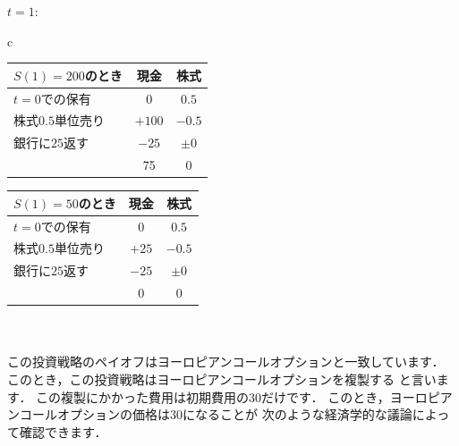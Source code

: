 $t=1$:
\begin{table}[htbp]
  \begin{center}
    \begin{tabular}{c}

      \begin{minipage}{0.5\hsize}
        \begin{center}
          \begin{tabular}{|l|c|c|}
            \hline
            $S(1)=200$のとき & 現金 & 株式 \\ \hline \hline
            $t=0$での保有 & 0 & $0.5$ \\
            株式$0.5$単位売り & $+100$ & $-0.5$ \\
            銀行に$25$返す & $-25$ & $\pm$0 \\ \hline
             & 75 & 0 \\
            \hline
          \end{tabular}
        \end{center}
      \end{minipage}

      \begin{minipage}{0.5\hsize}
        \begin{center}
          \begin{tabular}{|l|c|c|}
            \hline
            $S(1)=50$のとき & 現金 & 株式 \\ \hline \hline
            $t=0$での保有 & 0 & $0.5$ \\
            株式$0.5$単位売り & $+25$ & $-0.5$ \\
            銀行に$25$返す & $-25$ & $\pm$0 \\ \hline
             & 0 & 0 \\
            \hline
          \end{tabular}
        \end{center}
      \end{minipage}

    \end{tabular}
  \end{center}
\end{table}
\\
\\
この投資戦略のペイオフはヨーロピアンコールオプションと一致しています．
このとき，この投資戦略はヨーロピアンコールオプションを複製する
と言います．
この複製にかかった費用は初期費用の$30$だけです．
このとき，ヨーロピアンコールオプションの価格は$30$になることが
次のような経済学的な議論によって確認できます．
